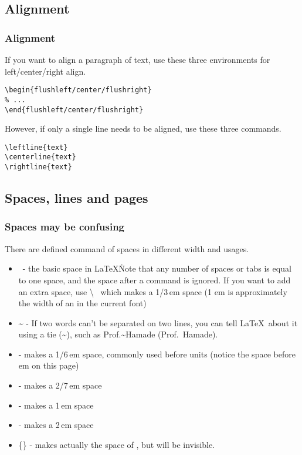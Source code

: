 \subsection{Alignment}

\begin{frame}[fragile]
    \frametitle{Alignment}
    If you want to align a paragraph of text, use these three environments for left/center/right align.
    \begin{command}
        \begin{verbatim}
\begin{flushleft/center/flushright}
% ...
\end{flushleft/center/flushright}
			\end{verbatim}
    \end{command}
    However, if only a single line needs to be aligned, use these three commands.
    \begin{command}
        \begin{verbatim}
\leftline{text}
\centerline{text}
\rightline{text}
		\end{verbatim}
    \end{command}
\end{frame}

\subsection{Spaces, lines and pages}

\begin{frame}
    \frametitle{Spaces may be confusing}
    There are defined command of spaces in different width and usages.
    \begin{itemize}
        \item \textvisiblespace\ - the basic space in \LaTeX\. Note that any number of spaces or tabs is equal to one space, and the space after a command is ignored. If you want to add an extra space, use \alert{\textbackslash\textvisiblespace\ } which makes a 1/3\,em space (1 em is approximately the width of an  in the current font)
        \item \~{} - If two words can't be separated on two lines, you can tell \LaTeX\ about it using a tie (\~{}), such as Prof.\~{}Hamade (Prof.~Hamade).
        \item  \samplecommand{,} - makes a 1/6\,em space, commonly used before units (notice the space before em on this page)
        \item  \samplecommand{;} - makes a 2/7\,em space
        \item  {} - makes a 1\,em space
        \item  {} - makes a 2\,em space
        \item  {}\{\} - makes actually the space of , but  will be invisible.
    \end{itemize}
\end{frame}

